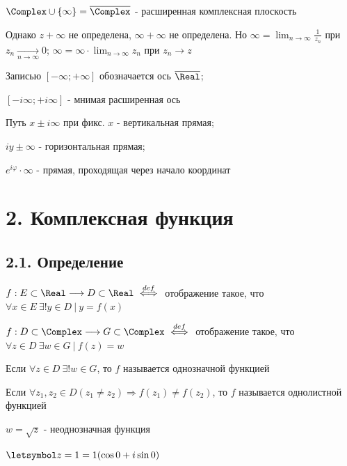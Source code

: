 \documentclass[12pt]{article}
\begin{document}
\Def $\Complex \cup \{\infty\} = \overline{\Complex}$ - расширенная комплексная плоскость

Однако $z + \infty$ не определена, $\infty + \infty$ не определена. 
Но $\infty = \lim_{n \to \infty} \frac{1}{z_n}$ при $z_n \underset{n \to \infty}{\longrightarrow} 0$; $\infty = \infty \cdot \lim_{n \to \infty} z_n$ при $z_n \longrightarrow z$

Записью $[-\infty; +\infty]$ обозначается ось $\overline{\Real}$; 

\qquad\qquad $[-i\infty; +i\infty]$ - мнимая расширенная ось

Путь $x \pm i \infty$ при фикс. $x$ - вертикальная прямая; 

\qquad\qquad $iy \pm \infty$ - горизонтальная прямая; 

\qquad\qquad $e^{i\varphi} \cdot \infty$ - прямая, проходящая через начало координат






\section{2. Комплексная функция}

\hypertarget{complex_function}{}

\subsection{2.1. Определение}

\Mem $f : E \subset \Real \longrightarrow D \subset \Real \ \overset{def}{\Longleftrightarrow} \ $ отображение такое, 
что $\forall x \in E \ \exists! y \in D \ | \ y = f(x)$

\Def $f : D \subset \Complex \longrightarrow G \subset \Complex \ \overset{def}{\Longleftrightarrow} \ $ отображение такое, 
что $\forall z \in D \ \exists w \in G \ | \ f(z) = w$

\Defs Если $\forall z \in D \ \exists! w \in G$, то $f$ называется однозначной функцией

\Defs Если $\forall z_1, z_2 \in D (z_1 \neq z_2) \Longrightarrow f(z_1) \neq f(z_2)$, 
то $f$ называется однолистной функцией

 $w = \sqrt{z}$ - неоднозначная функция

$\letsymbol z = 1 = 1 (\cos 0 + i \sin 0)$
\end{document}
